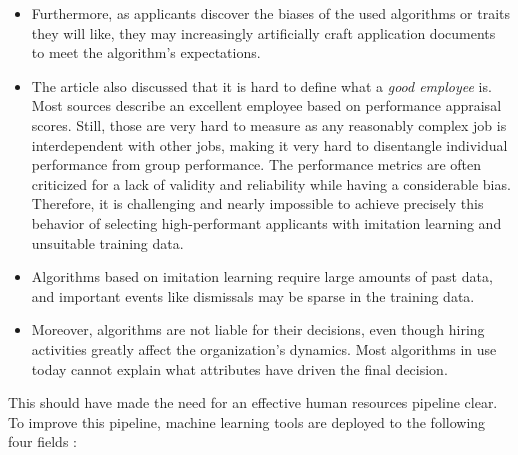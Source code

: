 \documentclass[draft,final]{thesisclass} %
\begin{document}
\begin{enumerate}
\begin{itemize}
        \item Furthermore, as applicants discover the biases of the used algorithms or traits they will like, they may increasingly artificially craft application documents to meet the algorithm's expectations.
        \item The article also discussed that it is hard to define what a \textit{good employee} is. Most sources describe an excellent employee based on performance appraisal scores. Still, those are very hard to measure as any reasonably complex job is interdependent with other jobs, making it very hard to disentangle individual performance from group performance. The performance metrics are often criticized for a lack of validity and reliability while having a considerable bias. Therefore, it is challenging and nearly impossible to achieve precisely this behavior of selecting high-performant applicants with imitation learning and unsuitable training data.
        \item Algorithms based on imitation learning require large amounts of past data, and important events like dismissals may be sparse in the training data.
        \item Moreover, algorithms are not liable for their decisions, even though hiring activities greatly affect the organization’s dynamics. Most algorithms in use today cannot explain what attributes have driven the final decision.
    \end{itemize}
\end{enumerate}
This should have made the need for an effective human resources pipeline clear. To improve this pipeline, machine learning tools are deployed to the following four fields \parencite[4-8]{ai_recruiting}:
\end{document}
